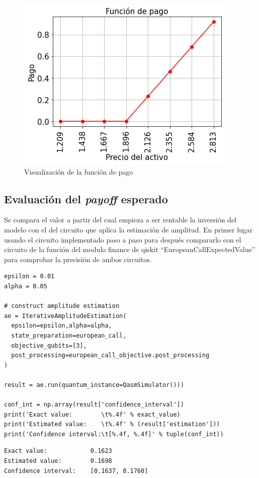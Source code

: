 \begin{figure}[h]
    \centering
    \includegraphics[width=\linewidth]{figures/notebooks/figura03.png}
    \caption{Visualización de la función de pago}
\end{figure}

\subsection{Evaluación del \textit{payoff} esperado}
Se compara el valor a partir del cual empieza a ser rentable la inversión del modelo con el del circuito que aplica la estimación de amplitud. En primer lugar usando el circuito implementado paso a paso para después compararlo con el circuito de la función del modulo finance de qiskit ``EuropeanCallExpectedValue'' para comprobar la precisión de ambos circuitos.

\begin{verbatim}
epsilon = 0.01
alpha = 0.05

# construct amplitude estimation
ae = IterativeAmplitudeEstimation(
  epsilon=epsilon,alpha=alpha,
  state_preparation=european_call,
  objective_qubits=[3],
  post_processing=european_call_objective.post_processing
)

result = ae.run(quantum_instance=QasmSimulator()))

conf_int = np.array(result['confidence_interval'])
print('Exact value:        \t%.4f' % exact_value)
print('Estimated value:    \t%.4f' % (result['estimation']))
print('Confidence interval:\t[%.4f, %.4f]' % tuple(conf_int))
\end{verbatim}
\begin{resultado}
\begin{verbatim}
Exact value:        	0.1623
Estimated value:    	0.1698
Confidence interval:	[0.1637, 0.1760]
\end{verbatim}
\end{resultado}


